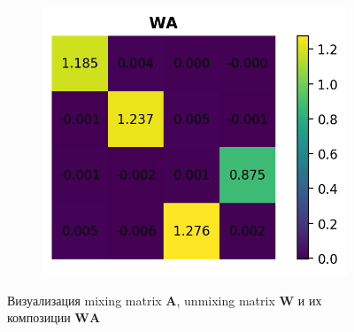 \documentclass[a4paper,12pt]{article}
\begin{document}
\begin{figure}[h!]
\begin{subfigure}{0.3\linewidth}
		\end{subfigure}
		\begin{subfigure}{0.3\linewidth}
			\includegraphics[width=\linewidth]{plots/WA2}
		\end{subfigure}
		
		\caption{Визуализация mixing matrix $\mathbf{A}$, unmixing matrix $\mathbf{W}$ и их композиции $\mathbf{WA}$}
	\end{figure}
	
\end{document}
